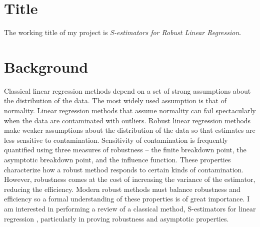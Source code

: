 \documentclass[]{STAT_547C}
\begin{document}
\vspace{-2cm}


\section{Title}

The working title of my project is \emph{S-estimators for Robust Linear Regression}.  

\section{Background}

Classical linear regression methods depend on a set of strong assumptions about the distribution of the data. The most widely used assumption is that of normality. Linear regression methods that assume normality can fail spectacularly when the data are contaminated with outliers. Robust linear regression methods make weaker assumptions about the distribution of the data so that estimates are less sensitive to contamination. Sensitivity of contamination is frequently quantified using three measures of robustness -- the finite breakdown point, the asymptotic breakdown point, and the influence function. These properties characterize how a robust method responds to certain kinds of contamination. However, robustness comes at the cost of increasing the variance of the estimator, reducing the efficiency. Modern robust methods must balance robustness and efficiency so a formal understanding of these properties is of great importance. I am interested in performing a review of a classical method, S-estimators for linear regression \cite{rousseeuw1984robust}, particularly in proving robustness and asymptotic properties.


\end{document}
